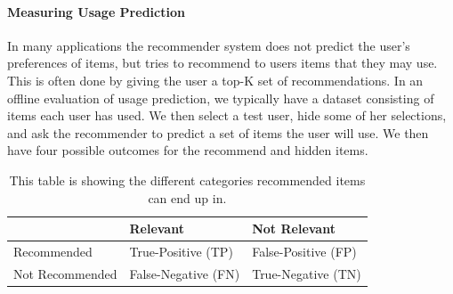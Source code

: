


\paragraph{Measuring Usage Prediction}
\label{para:measuring_usage}
In many applications the recommender system does not predict the user's
preferences of items, but tries to recommend to users items that they may use.
This is often done by giving the user a top-K set of recommendations.
In an offline evaluation of usage prediction, we typically have a dataset
consisting of items each user has used. We then select a test user, hide some
of her selections, and ask the recommender to predict a set of items the user
will use. We then have four possible outcomes for the recommend and hidden
items.

\begin{table}[H]
	\centering
	\begin{tabular}{l l l}
	\toprule
					&	Relevant			&	Not Relevant \\ \midrule
	Recommended		&	True-Positive (TP) 	&	False-Positive (FP)	\\
	Not Recommended	&	False-Negative (FN)	&	True-Negative (TN)	\\
	\bottomrule
	\end{tabular}
	\label{table:usageprediction}
	\caption[Usage prediction (Confusion Matrix)]{This table is showing the different categories recommended items can end up in.}
\end{table}

